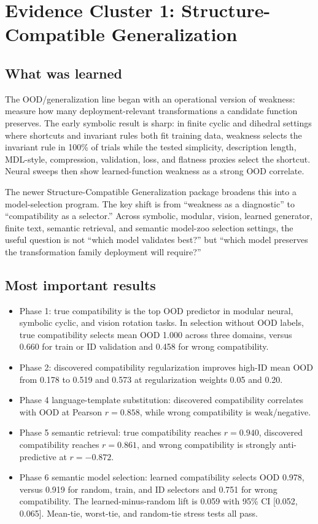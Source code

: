 \documentclass[11pt]{article}
\begin{document}
\section{Evidence Cluster 1: Structure-Compatible Generalization}

\subsection{What was learned}

The OOD/generalization line began with an operational version of weakness:
measure how many deployment-relevant transformations a candidate function
preserves. The early symbolic result is sharp: in finite cyclic and dihedral
settings where shortcuts and invariant rules both fit training data, weakness
selects the invariant rule in 100\% of trials while the tested simplicity,
description length, MDL-style, compression, validation, loss, and flatness
proxies select the shortcut. Neural sweeps then show learned-function weakness
as a strong OOD correlate.

The newer Structure-Compatible Generalization package broadens this into a
model-selection program. The key shift is from ``weakness as a diagnostic'' to
``compatibility as a selector.'' Across symbolic, modular, vision, learned
generator, finite text, semantic retrieval, and semantic model-zoo selection
settings, the useful question is not ``which model validates best?'' but
``which model preserves the transformation family deployment will require?''

\subsection{Most important results}

\begin{itemize}
  \item Phase 1: true compatibility is the top OOD predictor in modular neural,
  symbolic cyclic, and vision rotation tasks. In selection without OOD labels,
  true compatibility selects mean OOD 1.000 across three domains, versus 0.660
  for train or ID validation and 0.458 for wrong compatibility.
  \item Phase 2: discovered compatibility regularization improves high-ID mean
  OOD from 0.178 to 0.519 and 0.573 at regularization weights 0.05 and 0.20.
  \item Phase 4 language-template substitution: discovered compatibility
  correlates with OOD at Pearson \(r=0.858\), while wrong compatibility is
  weak/negative.
  \item Phase 5 semantic retrieval: true compatibility reaches \(r=0.940\),
  discovered compatibility reaches \(r=0.861\), and wrong compatibility is
  strongly anti-predictive at \(r=-0.872\).
  \item Phase 6 semantic model selection: learned compatibility selects OOD
  0.978, versus 0.919 for random, train, and ID selectors and 0.751 for wrong
  compatibility. The learned-minus-random lift is 0.059 with 95\% CI
  [0.052, 0.065]. Mean-tie, worst-tie, and random-tie stress tests all pass.
\end{itemize}
\end{document}
